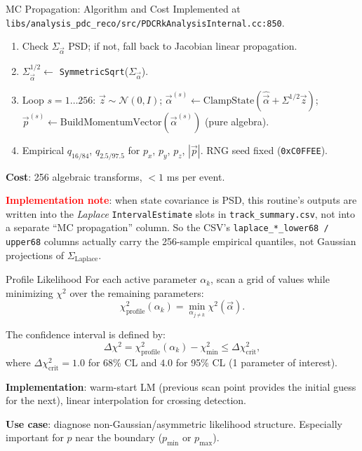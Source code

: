 \documentclass[aspectratio=169]{beamer}
\begin{document}
\begin{frame}{MC Propagation: Algorithm and Cost}
\small
Implemented at \texttt{libs/analysis\_pdc\_reco/src/PDCRkAnalysisInternal.cc:850}.

\begin{enumerate}\setlength{\itemsep}{0pt}
\item Check $\Sigma_{\vec{\alpha}}$ PSD; if not, fall back to Jacobian linear propagation.
\item $\Sigma_{\vec{\alpha}}^{1/2} \gets$ \texttt{SymmetricSqrt}($\Sigma_{\vec{\alpha}}$).
\item Loop $s = 1 \dots 256$: $\vec{z} \sim \mathcal{N}(0, I)$;
$\vec{\alpha}^{(s)} \gets \mathrm{ClampState}(\hat{\vec{\alpha}} + \Sigma^{1/2} \vec{z})$;
$\vec{p}^{(s)} \gets \mathrm{BuildMomentumVector}(\vec{\alpha}^{(s)})$ (pure algebra).
\item Empirical $q_{16/84}$, $q_{2.5/97.5}$ for $p_x$, $p_y$, $p_z$, $|\vec{p}|$. RNG seed fixed (\texttt{0xC0FFEE}).
\end{enumerate}

\textbf{Cost}: 256 algebraic transforms, $< 1$ ms per event.

\vspace{0.1cm}
\textcolor{red}{\textbf{Implementation note}}: when state covariance is PSD, this routine's outputs are written into the \emph{Laplace} \texttt{IntervalEstimate} slots in \texttt{track\_summary.csv}, not into a separate ``MC propagation'' column. So the CSV's \texttt{laplace\_*\_lower68 / upper68} columns actually carry the 256-sample empirical quantiles, not Gaussian projections of $\Sigma_\mathrm{Laplace}$.
\end{frame}

\begin{frame}{Profile Likelihood}
\small
For each active parameter $\alpha_k$, scan a grid of values while minimizing $\chi^2$ over the remaining parameters:
\[
\chi^2_\mathrm{profile}(\alpha_k) = \min_{\alpha_{j \neq k}} \chi^2(\vec{\alpha}).
\]

The confidence interval is defined by:
\[
\Delta\chi^2 = \chi^2_\mathrm{profile}(\alpha_k) - \chi^2_\mathrm{min} \leq \Delta\chi^2_\mathrm{crit},
\]
where $\Delta\chi^2_\mathrm{crit} = 1.0$ for 68\% CL and $4.0$ for 95\% CL (1 parameter of interest).

\vspace{0.2cm}
\textbf{Implementation}: warm-start LM (previous scan point provides the initial guess for the next), linear interpolation for crossing detection.

\vspace{0.2cm}
\textbf{Use case}: diagnose non-Gaussian/asymmetric likelihood structure. Especially important for $p$ near the boundary ($p_\mathrm{min}$ or $p_\mathrm{max}$).
\end{frame}
\end{document}
